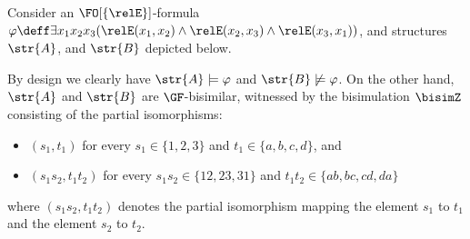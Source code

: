 \begin{example}
  Consider an $\FO[\{\relE\}]$-formula $\varphi \deff \exists{x_{1}x_{2}x_{3}}(\relE(x_{1}, x_{2}) \land \relE(x_{2}, x_{3}) \land \relE(x_{3}, x_{1}))$, and structures $\str{A}$, and $\str{B}$ depicted below.
  \begin{figure}[H]
  \centering
  \vspace{-0.2em}
  \end{figure}
  \vspace{-0.5em}
  \noindent
  By design we clearly have $\str{A}\models \varphi$ and $\str{B} \not\models \varphi$. On the other hand, $\str{A}$ and $\str{B}$ are $\GF$-bisimilar, witnessed by the bisimulation $\bisimZ$ consisting of the partial isomorphisms:
  \begin{itemize}
    \item $(s_{1}, t_{1})$ for every $s_{1} \in \{1,2,3\}$ and $t_{1} \in \{a,b,c,d\}$, and
    \item $(s_{1}s_{2}, t_{1}t_{2})$ for every $s_{1}s_{2} \in \{12,23,31\}$ and $t_{1}t_{2} \in \{ab,bc,cd,da\}$
  \end{itemize}
  where $(s_{1}s_{2}, t_{1}t_{2})$ denotes the partial isomorphism mapping the element $s_{1}$ to $t_{1}$ and the element $s_{2}$ to $t_{2}$.
\end{example}

\clearpage
